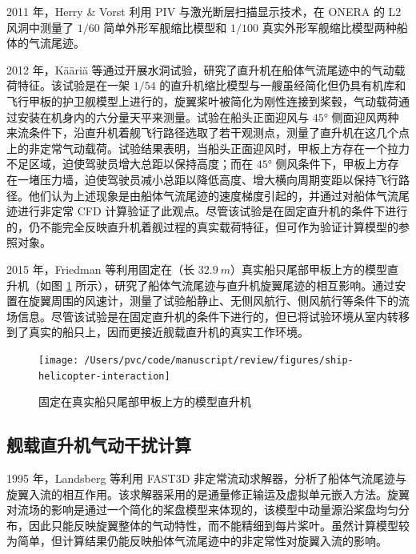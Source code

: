 2011 年，Herry \& Vorst 利用 PIV 与激光断层扫描显示技术，在 ONERA
的 L2 风洞中测量了 $1/60$ 简单外形军舰缩比模型和 $1/100$ 真实外形军舰缩比模型两种船体的气流尾迹。

2012 年，Kääriä 等通过开展水洞试验，研究了直升机在船体气流尾迹中的气动载荷特征。该试验是在一架
$1/54$ 的直升机缩比模型与一艘虽经简化但仍具有机库和飞行甲板的护卫舰模型上进行的，旋翼桨叶被简化为刚性连接到桨毂，气动载荷通过安装在机身内的六分量天平来测量。试验在船头正面迎风与
$\ang{45}$ 侧面迎风两种来流条件下，沿直升机着舰飞行路径选取了若干观测点，测量了直升机在这几个点上的非定常气动载荷。试验结果表明，当船头正面迎风时，甲板上方存在一个拉力不足区域，迫使驾驶员增大总距以保持高度；而在
$\ang{45}$ 侧风条件下，甲板上方存在一堵压力墙，迫使驾驶员减小总距以降低高度、增大横向周期变距以保持飞行路径。他们认为上述现象是由船体气流尾迹的速度梯度引起的，并通过对船体气流尾迹进行非定常
CFD 计算验证了此观点。尽管该试验是在固定直升机的条件下进行的，仍不能完全反映直升机着舰过程的真实载荷特征，但可作为验证计算模型的参照对象。

2015 年，Friedman 等利用固定在（长 $\SI{32.9}{m}$）真实船只尾部甲板上方的模型直升机（如图
\ref{fig:real_ship} 所示），研究了船体气流尾迹与直升机旋翼尾迹的相互影响。通过安置在旋翼周围的风速计，测量了试验船静止、无侧风航行、侧风航行等条件下的流场信息。尽管该试验是在固定直升机的条件下进行的，但已将试验环境从室内转移到了真实的船只上，因而更接近舰载直升机的真实工作环境。
\begin{figure}[h!]
\begin{centering}
\texttt{[image: /Users/pvc/code/manuscript/review/figures/ship-helicopter-interaction]}
\par\end{centering}
\caption{\label{fig:real_ship}固定在真实船只尾部甲板上方的模型直升机}
\end{figure}


\subsection{舰载直升机气动干扰计算}

1995 年，Landsberg 等利用 FAST3D 非定常流动求解器，分析了船体气流尾迹与旋翼入流的相互作用。该求解器采用的是通量修正输运及虚拟单元嵌入方法。旋翼对流场的影响是通过一个简化的桨盘模型来体现的，该模型中动量源沿桨盘均匀分布，因此只能反映旋翼整体的气动特性，而不能精细到每片桨叶。虽然计算模型较为简单，但计算结果仍能反映船体气流尾迹中的非定常性对旋翼入流的影响。

